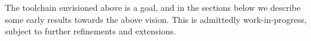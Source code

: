 The toolchain envisioned above is a goal, and in the sections below we describe some early results towards the above vision. This is admittedly work-in-progress, subject to further refinements and extensions. 
